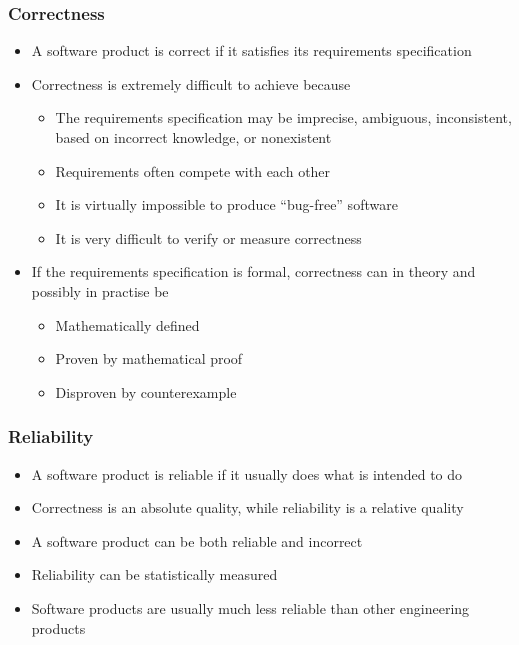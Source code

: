 \documentclass[t,12pt,numbers,fleqn]{beamer}
\begin{document}

\begin{frame}
\frametitle{Correctness}

\begin{itemize}
\item A software product is correct if it satisfies its requirements specification
\item Correctness is extremely difficult to achieve because
\begin{itemize}
\item The requirements specification may be imprecise, ambiguous, inconsistent,
  based on incorrect knowledge, or nonexistent
\item Requirements often compete with each other
\item It is virtually impossible to produce ``bug-free'' software
\item It is very difficult to verify or measure correctness
\end{itemize}
\item If the requirements specification is formal, correctness can in theory and
  possibly in practise be
\begin{itemize}
\item Mathematically defined
\item Proven by mathematical proof
\item Disproven by counterexample
\end{itemize}
\end{itemize}

\end{frame}


\begin{frame}
\frametitle{Reliability}

\begin{itemize}
\item A software product is reliable if it usually does what is intended to do
\item Correctness is an absolute quality, while reliability is a relative quality
\item A software product can be both reliable and incorrect
\item Reliability can be statistically measured
\item Software products are usually much less reliable than other engineering
  products
\end{itemize}

\end{frame}
\end{document}
